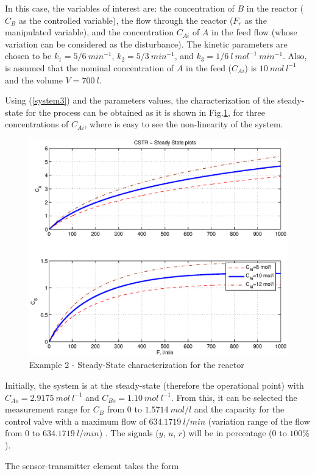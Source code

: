 In this case, the variables of interest are: the concentration of
$B$ in the reactor ($C_B$ as the controlled variable), the flow
through the reactor ($F_r$ as the manipulated variable), and the
concentration $C_{Ai}$ of $A$ in the feed flow (whose variation
can be considered as the disturbance). The kinetic parameters are
chosen to be $k_1 = 5/6 \ min^{-1}$, $k_2 = 5/3 \ min^{-1}$, and
$k_3 = 1/6 \ l \ mol^{-1} \ min^{-1}$. Also, is assumed that the
nominal concentration of $A$ in the feed ($C_{Ai}$) is $10 \ mol \
l^{-1}$ and the volume $V = 700 \ l$.

Using (\ref{system3}) and the parameters values, the
characterization of the steady-state for the process can be
obtained as it is shown in Fig.\ref{c_estatica}, for three
concentrations of $C_{Ai}$, where is easy to see the non-linearity
of the system.

\begin{figure}[htb!]
    \begin{center}
        \includegraphics[width=0.7\linewidth]{c_estatica.eps}
        \caption{Example 2 - Steady-State characterization for the reactor}
        \label{c_estatica}
    \end{center}
\end{figure}

Initially, the system is at the steady-state (therefore the
operational point) with $C_{Ao} = 2.9175 \ mol \ l^{-1}$ and
$C_{Bo} = 1.10 \ mol \ l^{-1}$. From this, it can be selected the
measurement range for $C_B$ from $0$ to $1.5714 \ mol/l$ and the
capacity for the control valve with a maximum flow of $634.1719 \
l/min$ (variation range of the flow from $0$ to $634.1719 \
l/min$) \cite{arrietaETFA2008}. The signals ($y$, $u$, $r$) will
be in percentage ($0$ to $100\%$).

The sensor-transmitter element takes the form

